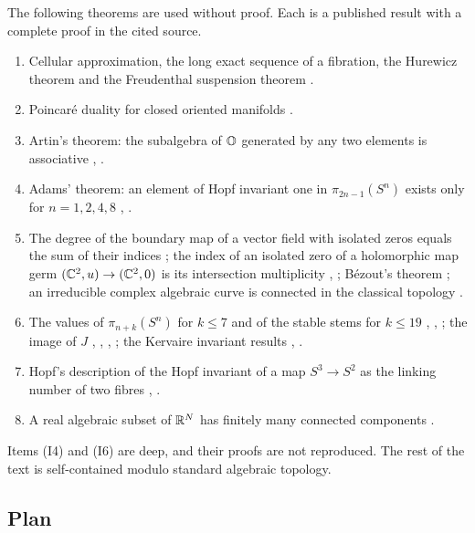 The following theorems are used without proof. Each is a published result with a complete proof in the cited source.
\begin{enumerate}[label=(I\arabic*)]
\item Cellular approximation, the long exact sequence of a fibration, the Hurewicz theorem and the Freudenthal suspension theorem \cite[Chapter~4]{Hat02}.
\item Poincar\'e duality for closed oriented manifolds \cite[Section~3.3]{Hat02}.
\item Artin's theorem: the subalgebra of $\mathbb{O}$ generated by any two elements is associative \cite[Chapter~III]{Sch66}, \cite{Bae02}.
\item Adams' theorem: an element of Hopf invariant one in $\pi_{2n-1}(S^n)$ exists only for $n=1,2,4,8$ \cite{Ada60}, \cite{AA66}.
\item The degree of the boundary map of a vector field with isolated zeros equals the sum of their indices \cite[Section~6]{Mil65}; the index of an isolated zero of a holomorphic map germ $(\mathbb{C}^2,u)\to(\mathbb{C}^2,0)$ is its intersection multiplicity \cite[Chapter~5]{GH78}, \cite[Chapter~5]{AGV85}; B\'ezout's theorem \cite[Chapter~5]{Ful69}; an irreducible complex algebraic curve is connected in the classical topology \cite[Corollary~(4.16)]{Mum76}.
\item The values of $\pi_{n+k}(S^n)$ for $k\le 7$ and of the stable stems for $k\le19$ \cite{Tod62}, \cite{Rav86}, \cite{IWX23}; the image of $J$ \cite{Ada66}, \cite{Qui71}, \cite{Sul74}, \cite{BG75}; the Kervaire invariant results \cite{Bro69}, \cite{HHR16}.
\item Hopf's description of the Hopf invariant of a map $S^3\to S^2$ as the linking number of two fibres \cite{Hop31}, \cite[Section~17]{BT82}.
\item A real algebraic subset of $\mathbb{R}^N$ has finitely many connected components \cite[Theorem~2.4.4]{BCR98}.
\end{enumerate}
Items (I4) and (I6) are deep, and their proofs are not reproduced. The rest of the text is self-contained modulo standard algebraic topology.

\subsection{Plan}

